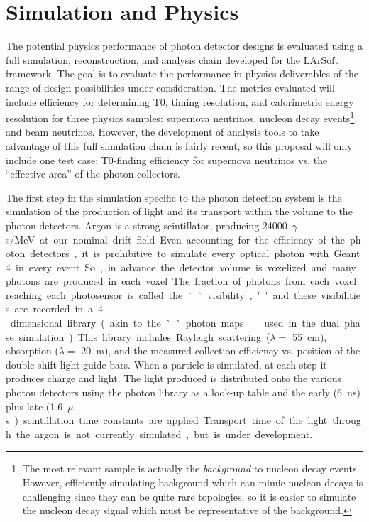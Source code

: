 \section{Simulation and Physics}
\label{sec:fdsp-pd-simphys}


The potential physics performance of photon detector designs is evaluated using a full simulation, reconstruction, and analysis chain developed for the LArSoft framework. The goal is to evaluate the performance in physics deliverables of the range of design possibilities under consideration. The metrics evaluated will include efficiency for determining T0, timing resolution, and calorimetric energy resolution for three physics samples: supernova neutrinos, nucleon decay events\footnote{The most relevant sample is actually the \emph{background} to nucleon decay events. However, efficiently simulating background which can mimic nucleon decays is challenging since they can be quite rare topologies, so it is easier to simulate the nucleon decay signal which must be representative of the background.}, and beam neutrinos. However, the development of analysis tools to take advantage of this full simulation chain is fairly recent, so this proposal will only include one test case: T0-finding efficiency for supernova neutrinos vs. the ``effective area'' of the photon collectors.

The first step in the simulation specific to the photon detection system is the simulation of the production of light and its transport within the volume to the photon detectors. Argon is a strong scintillator, producing \SI{24000}{$\gamma$s/MeV} at our nominal drift field. Even accounting for the efficiency of the photon detectors, it is prohibitive to simulate every optical photon with Geant4 in every event. So, in advance the detector volume is voxelized and many photons are produced in each voxel. The fraction of photons from each voxel reaching each photosensor is called the ``visibility,'' and these visibilities are recorded in a 4-dimensional library (akin to the ``photon maps'' used in the dual phase simulation). This library includes Rayleigh scattering ($\lambda=$ \SI{55}{cm}), absorption ($\lambda=$ \SI{20}{m}), and the measured collection efficiency vs. position of the double-shift light-guide bars. When a particle is simulated, at each step it produces charge and light. The light produced is distributed onto the various photon detectors using the photon library as a look-up table and the early (\SI{6}{ns}) plus late (\SI{1.6}{$\mu$s}) scintillation time constants are applied. Transport time of the light through the argon is not currently simulated, but is under development.

